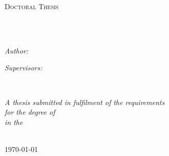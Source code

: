 \documentclass[
11pt, %
english, %
singlespacing, %
headsepline, %
]{MastersDoctoralThesis} %
\author{Alaeddin \textsc{Nassani}} %
\begin{document}
\frontmatter %

\pagestyle{plain} %


\begin{titlepage}
\begin{center}

\vspace*{.06\textheight}
{\scshape\LARGE \univname\par}\vspace{1.5cm} %
\textsc{\Large Doctoral Thesis}\\[0.5cm] %

\HRule \\[0.4cm] %
{\huge \bfseries \ttitle\par}\vspace{0.4cm} %
\HRule \\[1.5cm] %
 
\begin{minipage}[t]{0.4\textwidth}
\begin{flushleft} \large
\emph{Author:}\\
{\authorname} %
\end{flushleft}
\end{minipage}
\begin{minipage}[t]{0.45\textwidth}
\begin{flushright} \large
\emph{Supervisors:} \\
{\supname} %
\end{flushright}
\end{minipage}\\[3cm]
 
\vfill

\large \textit{A thesis submitted in fulfilment of the requirements\\ for the degree of \degreename}\\[0.3cm] %
\textit{in the}\\[0.4cm]
\deptname\\[2cm] %
 
\vfill

{\large \today}\\[4cm] %
 
\vfill
\end{center}
\end{titlepage}
\end{document}
